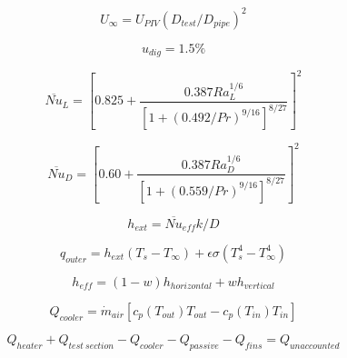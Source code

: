 \[
U_\infty=U_{PIV}(D_{test}/D_{pipe})^2
\]

\[
u_{dig}=1.5\%
\]

\[
\overline{Nu}_L=\left[0.825+\frac{0.387Ra_L^{1/6}}{[1+(0.492/Pr)^{9/16}]^{8/27}}\right]^2
\]

\[
\overline{Nu}_D=\left[0.60+\frac{0.387Ra_D^{1/6}}{[1+(0.559/Pr)^{9/16}]^{8/27}}\right]^2
\]

\[
h_{ext}=\overline{Nu}_{eff}k/D
\]

\[
q_{outer}=h_{ext}(T_s-T_\infty)+\epsilon\sigma(T_s^4-T_\infty^4)
\]

\[
h_{eff}=(1-w)h_{horizontal}+wh_{vertical}
\]

\[
Q_{cooler}=\dot m_{air}[c_p(T_{out})T_{out}-c_p(T_{in})T_{in}]
\]

\[
Q_{heater}+Q_{test\ section}-Q_{cooler}-Q_{passive}-Q_{fins}=Q_{unaccounted}
\]

